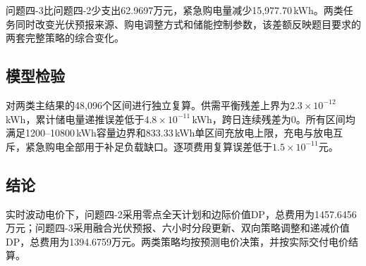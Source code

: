 问题四-3比问题四-2少支出62.9697万元，紧急购电量减少15,977.70\,kWh。两类任务同时改变光伏预报来源、购电调整方式和储能控制参数，该差额反映题目要求的两套完整策略的综合变化。

\subsection{模型检验}

对两类主结果的48,096个区间进行独立复算。供需平衡残差上界为$2.3\times10^{-12}$\,kWh，累计储电量递推误差低于$4.8\times10^{-11}$\,kWh，跨日连续残差为0。所有区间均满足1200--10800\,kWh容量边界和833.33\,kWh单区间充放电上限，充电与放电互斥，紧急购电全部用于补足负载缺口。逐项费用复算误差低于$1.5\times10^{-11}$元。

\subsection{结论}

实时波动电价下，问题四-2采用零点全天计划和边际价值DP，总费用为1457.6456万元；问题四-3采用融合光伏预报、六小时分段更新、双向策略调整和递减价值DP，总费用为1394.6759万元。两类策略均按预测电价决策，并按实际交付电价结算。
